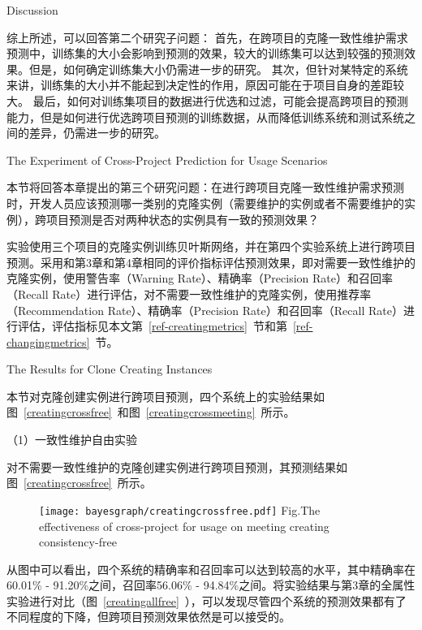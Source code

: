 {Discussion}

综上所述，可以回答第二个研究子问题：
首先，在跨项目的克隆一致性维护需求预测中，训练集的大小会影响到预测的效果，较大的训练集可以达到较强的预测效果。但是，如何确定训练集大小仍需进一步的研究。
其次，但针对某特定的系统来讲，训练集的大小并不能起到决定性的作用，原因可能在于项目自身的差距较大。
最后，如何对训练集项目的数据进行优选和过滤，可能会提高跨项目的预测能力，但是如何进行优选跨项目预测的训练数据，从而降低训练系统和测试系统之间的差异，仍需进一步的研究。

{The Experiment of Cross-Project Prediction for Usage Scenarios}

本节将回答本章提出的第三个研究问题：在进行跨项目克隆一致性维护需求预测时，开发人员应该预测哪一类别的克隆实例（需要维护的实例或者不需要维护的实例），跨项目预测是否对两种状态的实例具有一致的预测效果？

实验使用三个项目的克隆实例训练贝叶斯网络，并在第四个实验系统上进行跨项目预测。采用和第3章和第4章相同的评价指标评估预测效果，即对需要一致性维护的克隆实例，使用警告率（Warning Rate）、精确率（Precision Rate）和召回率（Recall Rate）进行评估，对不需要一致性维护的克隆实例，使用推荐率（Recommendation Rate）、精确率（Precision Rate）和召回率（Recall Rate）进行评估，评估指标见本文第~\ref{ref-creatingmetrics}~节和第~\ref{ref-changingmetrics}~节。

{The Results for Clone Creating Instances}

本节对克隆创建实例进行跨项目预测，四个系统上的实验结果如图~\ref{creatingcrossfree}~和图~\ref{creatingcrossmeeting}~所示。


（1）一致性维护自由实验

对不需要一致性维护的克隆创建实例进行跨项目预测，其预测结果如图~\ref{creatingcrossfree}~所示。

\begin{figure}[h]
\centering
\texttt{[image: bayesgraph/creatingcrossfree.pdf]}
{Fig.$\!$}{The effectiveness of cross-project for usage on meeting creating consistency-free}
\vspace{-1em}
\end{figure}

从图中可以看出，四个系统的精确率和召回率可以达到较高的水平，其中精确率在60.01\% - 91.20\%之间，召回率56.06\% - 94.84\%之间。将实验结果与第3章的全属性实验进行对比（图~\ref{creatingallfree}~），可以发现尽管四个系统的预测效果都有了不同程度的下降，但跨项目预测效果依然是可以接受的。

